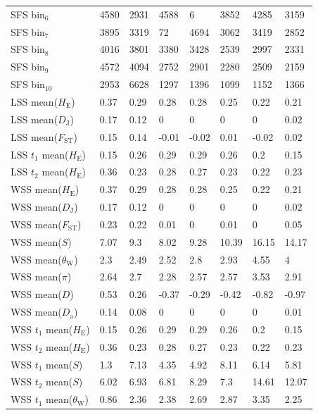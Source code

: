 \documentclass[a4paper, 12pt]{article}
\begin{document}
\begin{tiny}
\begin{longtable}{p{3.0cm}p{1.0cm}p{1.0cm}p{1.0cm}p{1.0cm}p{1.0cm}p{1.0cm}p{1.0cm}}
SFS bin$_6$ & 4580 & 2931 & 4588 & 6 & 3852 & 4285 & 3159 \\
SFS bin$_7$ & 3895 & 3319 & 72 & 4694 & 3062 & 3419 & 2852 \\
SFS bin$_8$ & 4016 & 3801 & 3380 & 3428 & 2539 & 2997 & 2331 \\
SFS bin$_9$ & 4572 & 4094 & 2752 & 2901 & 2280 & 2509 & 2159 \\
SFS bin$_10$ & 2953 & 6628 & 1297 & 1396 & 1099 & 1152 & 1366 \\
LSS mean($H_{\mathrm{E}}$) & 0.37 & 0.29 & 0.28 & 0.28 & 0.25 & 0.22 & 0.21 \\
LSS mean($D_{\mathrm{J}}$) & 0.17 & 0.12 & 0 & 0 & 0 & 0 & 0.02 \\
LSS mean($F_{\mathrm{ST}}$) & 0.15 & 0.14 & -0.01 & -0.02 & 0.01 & -0.02 & 0.02 \\
LSS $t_1$ mean($H_{\mathrm{E}}$) & 0.15 & 0.26 & 0.29 & 0.29 & 0.26 & 0.2 & 0.15 \\
LSS $t_2$ mean($H_{\mathrm{E}}$) & 0.36 & 0.23 & 0.28 & 0.27 & 0.23 & 0.22 & 0.23 \\
WSS mean($H_{\mathrm{E}}$) & 0.37 & 0.29 & 0.28 & 0.28 & 0.25 & 0.22 & 0.21 \\
WSS mean($D_{\mathrm{J}}$) & 0.17 & 0.12 & 0 & 0 & 0 & 0 & 0.02 \\
WSS mean($F_{\mathrm{ST}}$) & 0.23 & 0.22 & 0.01 & 0 & 0.01 & 0 & 0.05 \\
WSS mean($S$) & 7.07 & 9.3 & 8.02 & 9.28 & 10.39 & 16.15 & 14.17 \\
WSS mean($\theta_{\mathrm{W}}$) & 2.3 & 2.49 & 2.52 & 2.8 & 2.93 & 4.55 & 4 \\
WSS mean($\pi$) & 2.64 & 2.7 & 2.28 & 2.57 & 2.57 & 3.53 & 2.91 \\
WSS mean($D$) & 0.53 & 0.26 & -0.37 & -0.29 & -0.42 & -0.82 & -0.97 \\
WSS mean($D_{\mathrm{a}}$) & 0.14 & 0.08 & 0 & 0 & 0 & 0 & 0.01 \\
WSS $t_1$ mean($H_{\mathrm{E}}$) & 0.15 & 0.26 & 0.29 & 0.29 & 0.26 & 0.2 & 0.15 \\
WSS $t_2$ mean($H_{\mathrm{E}}$) & 0.36 & 0.23 & 0.28 & 0.27 & 0.23 & 0.22 & 0.23 \\
WSS $t_1$ mean($S$) & 1.3 & 7.13 & 4.35 & 4.92 & 8.11 & 6.14 & 5.81 \\
WSS $t_2$ mean($S$) & 6.02 & 6.93 & 6.81 & 8.29 & 7.3 & 14.61 & 12.07 \\
WSS $t_1$ mean($\theta_{\mathrm{W}}$) & 0.86 & 2.36 & 2.38 & 2.69 & 2.87 & 3.35 & 2.25 \\

\end{longtable}
\end{tiny}
\end{document}
